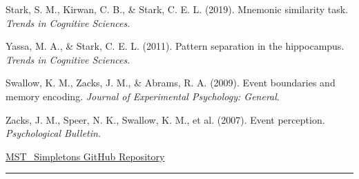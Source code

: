 \documentclass[
  12pt,
]{article}
\begin{document}
Stark, S. M., Kirwan, C. B., \& Stark, C. E. L. (2019). Mnemonic
similarity task. \emph{Trends in Cognitive Sciences}.

Yassa, M. A., \& Stark, C. E. L. (2011). Pattern separation in the
hippocampus. \emph{Trends in Cognitive Sciences}.

Swallow, K. M., Zacks, J. M., \& Abrams, R. A. (2009). Event boundaries
and memory encoding. \emph{Journal of Experimental Psychology:
General}.

Zacks, J. M., Speer, N. K., Swallow, K. M., et al. (2007). Event
perception. \emph{Psychological Bulletin}.

\href{https://github.com/Anurag-1205/MST_Simpletons}{MST\_Simpletons GitHub Repository}

\begin{center}\rule{0.5\linewidth}{0.5pt}\end{center}
\end{document}
